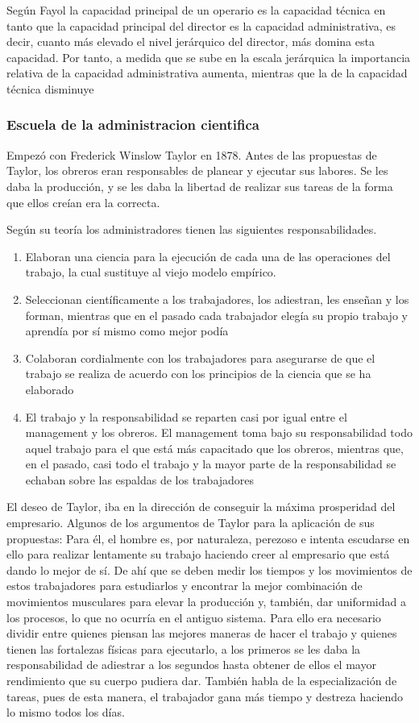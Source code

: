 \documentclass[titlepage,a4paper]{article}
\begin{document}
Según Fayol la capacidad principal de un operario es la capacidad técnica en tanto que la capacidad principal del director es la capacidad administrativa, es decir, cuanto más elevado el nivel jerárquico del director, más domina esta capacidad. Por tanto, a medida que se sube en la escala jerárquica la importancia relativa de la capacidad administrativa aumenta, mientras que la de la capacidad técnica disminuye
 
\subsubsection*{Escuela de la administracion cientifica}
Empezó con Frederick Winslow Taylor en 1878. Antes de las propuestas de Taylor, los obreros eran responsables de planear y ejecutar sus labores. Se les daba la producción, y se les daba la libertad de realizar sus tareas de la forma que ellos creían era la correcta.

Según su teoría los administradores tienen las siguientes responsabilidades.
\begin{enumerate}
    \item Elaboran una ciencia para la ejecución de cada una de las operaciones del trabajo, la cual sustituye al viejo modelo empírico.
    \item Seleccionan científicamente a los trabajadores, los adiestran, les enseñan y los forman, mientras que en el pasado cada trabajador elegía su propio trabajo y aprendía por sí mismo como mejor podía
    \item Colaboran cordialmente con los trabajadores para asegurarse de que el trabajo se realiza de acuerdo con los principios de la ciencia que se ha elaborado 
    \item El trabajo y la responsabilidad se reparten casi por igual entre el management y los obreros. El management toma bajo su responsabilidad todo aquel trabajo para el que está más capacitado que los obreros, mientras que, en el pasado, casi todo el trabajo y la mayor parte de la responsabilidad se echaban sobre las espaldas de los trabajadores
\end{enumerate}

El deseo de Taylor, iba en la dirección de conseguir la máxima prosperidad del empresario. Algunos de los argumentos de Taylor para la aplicación de sus propuestas: Para él, el hombre es, por naturaleza, perezoso e intenta escudarse en ello para realizar lentamente su trabajo haciendo creer al empresario que está dando lo mejor de sí. De ahí que se deben medir los tiempos y los movimientos de estos trabajadores para estudiarlos y encontrar la mejor combinación de movimientos musculares para elevar la producción y, también, dar uniformidad a los procesos, lo que no ocurría en el antiguo sistema. Para ello era necesario dividir entre quienes piensan las mejores maneras de hacer el trabajo y quienes tienen las fortalezas físicas para ejecutarlo, a los primeros se les daba la responsabilidad de adiestrar a los segundos hasta obtener de ellos el mayor rendimiento que su cuerpo pudiera dar. También habla de la especialización de tareas, pues de esta manera, el trabajador gana más tiempo y destreza haciendo lo mismo todos los días.
\end{document}

